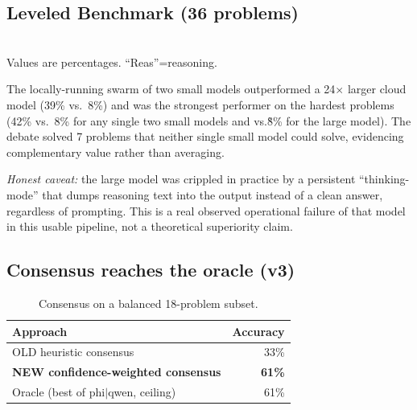 \documentclass[10pt,twocolumn]{article}
\begin{document}
\subsection{Leveled Benchmark (36 problems)}
\begin{table}[t]
  \centering
  \caption{Overall accuracy, 36-problem benchmark. Highest in each column in
  bold.}
  \label{tab:leveled}
  \\[2mm]
  \footnotesize Values are percentages. ``Reas''=reasoning.
\end{table}

The locally-running swarm of two small models outperformed a 24$\times$ larger
cloud model (39\% vs.\ 8\%) and was the strongest performer on the hardest
problems (42\% vs.\ 8\% for any single two small models and vs.\~8\% for the
large model). The debate solved 7 problems that neither single small model
could solve, evidencing complementary value rather than averaging.

\emph{Honest caveat:} the large model was crippled in practice by a persistent
``thinking-mode'' that dumps reasoning text into the output instead of a clean
answer, regardless of prompting. This is a real observed operational failure of
that model in this usable pipeline, not a theoretical superiority claim.

\subsection{Consensus reaches the oracle (v3)}
\begin{table}[t]
  \centering
  \small
  \caption{Consensus on a balanced 18-problem subset.}
  \label{tab:consensus}
  \begin{tabular}{@{}lr@{}}
    \toprule
    Approach & Accuracy \\
    \midrule
    OLD heuristic consensus & 33\% \\
    \textbf{NEW confidence-weighted consensus} & \textbf{61\%} \\
    Oracle (best of phi$|$qwen, ceiling) & 61\% \\
    \bottomrule
  \end{tabular}
\end{table}
\end{document}

